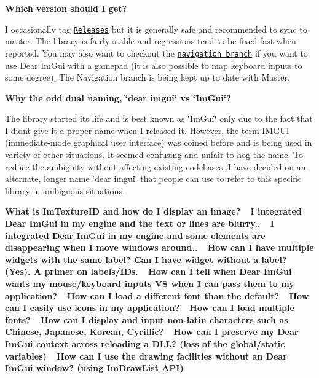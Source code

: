 {\bfseries Which version should I get?}

I occasionally tag \href{https://github.com/ocornut/imgui/releases}{\tt Releases} but it is generally safe and recommended to sync to master. The library is fairly stable and regressions tend to be fixed fast when reported. You may also want to checkout the \href{https://github.com/ocornut/imgui/tree/navigation}{\tt navigation branch} if you want to use Dear Im\+Gui with a gamepad (it is also possible to map keyboard inputs to some degree). The Navigation branch is being kept up to date with Master.

{\bfseries Why the odd dual naming, \char`\"{}dear imgui\char`\"{} vs \char`\"{}\+Im\+Gui\char`\"{}?}

The library started its life and is best known as \char`\"{}\+Im\+Gui\char`\"{} only due to the fact that I didn\textquotesingle{}t give it a proper name when I released it. However, the term I\+M\+G\+UI (immediate-\/mode graphical user interface) was coined before and is being used in variety of other situations. It seemed confusing and unfair to hog the name. To reduce the ambiguity without affecting existing codebases, I have decided on an alternate, longer name \char`\"{}dear imgui\char`\"{} that people can use to refer to this specific library in ambiguous situations.

{\bfseries What is Im\+Texture\+ID and how do I display an image?} ~\newline
{\bfseries I integrated Dear Im\+Gui in my engine and the text or lines are blurry..} ~\newline
{\bfseries I integrated Dear Im\+Gui in my engine and some elements are disappearing when I move windows around..} ~\newline
{\bfseries How can I have multiple widgets with the same label? Can I have widget without a label? (Yes). A primer on labels/\+I\+Ds.} ~\newline
{\bfseries How can I tell when Dear Im\+Gui wants my mouse/keyboard inputs VS when I can pass them to my application?} ~\newline
{\bfseries How can I load a different font than the default?} ~\newline
{\bfseries How can I easily use icons in my application?} ~\newline
{\bfseries How can I load multiple fonts?} ~\newline
{\bfseries How can I display and input non-\/latin characters such as Chinese, Japanese, Korean, Cyrillic?} ~\newline
{\bfseries How can I preserve my Dear Im\+Gui context across reloading a D\+LL? (loss of the global/static variables)} ~\newline
{\bfseries How can I use the drawing facilities without an Dear Im\+Gui window? (using \hyperlink{struct_im_draw_list}{Im\+Draw\+List} A\+PI)}

